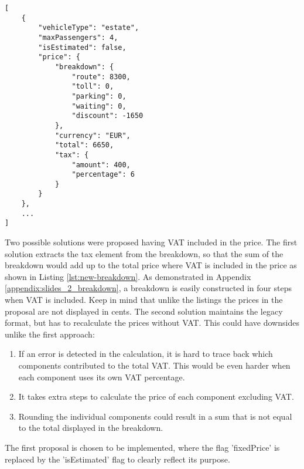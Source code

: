 \noindent\begin{minipage}{.45\textwidth}
\begin{lstlisting}[caption={Improved price breakdown}, label={lst:new-breakdown}]
[
	{
		"vehicleType": "estate",
		"maxPassengers": 4,
		"isEstimated": false,
		"price": {
			"breakdown": {
				"route": 8300,
				"toll": 0,
				"parking": 0,
				"waiting": 0,
				"discount": -1650
			},
			"currency": "EUR",
			"total": 6650,
			"tax": {
				"amount": 400,
				"percentage": 6
			}
		}
	},
	...
]
\end{lstlisting}
\end{minipage}

Two possible solutions were proposed having VAT included in the price. The first solution extracts the tax element from the breakdown, so that the sum of the breakdown would add up to the total price where VAT is included in the price as shown in Listing \ref{lst:new-breakdown}. As demonstrated in Appendix \ref{appendix:slides_2_breakdown}, a breakdown is easily constructed in four steps when VAT is included. Keep in mind that unlike the listings the prices in the proposal are not displayed in cents. The second solution maintains the legacy format, but has to recalculate the prices without VAT. This could have downsides unlike the first approach:

\begin{enumerate}
	\item If an error is detected in the calculation, it is hard to trace back which components contributed to the total VAT. This would be even harder when each component uses its own VAT percentage.
	\item It takes extra steps to calculate the price of each component excluding VAT.
	\item Rounding the individual components could result in a sum that is not equal to the total displayed in the breakdown.
\end{enumerate}

The first proposal is chosen to be implemented, where the flag 'fixedPrice' is replaced by the 'isEstimated' flag to clearly reflect its purpose.

%
